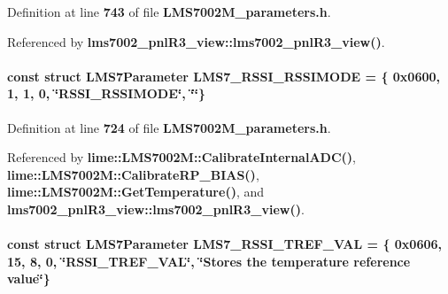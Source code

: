 Definition at line {\bf 743} of file {\bf L\+M\+S7002\+M\+\_\+parameters.\+h}.



Referenced by {\bf lms7002\+\_\+pnl\+R3\+\_\+view\+::lms7002\+\_\+pnl\+R3\+\_\+view()}.

\paragraph[{L\+M\+S7\+\_\+\+R\+S\+S\+I\+\_\+\+R\+S\+S\+I\+M\+O\+DE}]{\setlength{\rightskip}{0pt plus 5cm}const struct {\bf L\+M\+S7\+Parameter} L\+M\+S7\+\_\+\+R\+S\+S\+I\+\_\+\+R\+S\+S\+I\+M\+O\+DE = \{ 0x0600, 1, 1, 0, \char`\"{}\+R\+S\+S\+I\+\_\+\+R\+S\+S\+I\+M\+O\+D\+E\char`\"{}, \char`\"{}\char`\"{}\}\hspace{0.3cm}{\ttfamily [static]}}\label{LMS7002M__parameters_8h_ab9c6791a15331e828922208749cb6026}


Definition at line {\bf 724} of file {\bf L\+M\+S7002\+M\+\_\+parameters.\+h}.



Referenced by {\bf lime\+::\+L\+M\+S7002\+M\+::\+Calibrate\+Internal\+A\+D\+C()}, {\bf lime\+::\+L\+M\+S7002\+M\+::\+Calibrate\+R\+P\+\_\+\+B\+I\+A\+S()}, {\bf lime\+::\+L\+M\+S7002\+M\+::\+Get\+Temperature()}, and {\bf lms7002\+\_\+pnl\+R3\+\_\+view\+::lms7002\+\_\+pnl\+R3\+\_\+view()}.

\paragraph[{L\+M\+S7\+\_\+\+R\+S\+S\+I\+\_\+\+T\+R\+E\+F\+\_\+\+V\+AL}]{\setlength{\rightskip}{0pt plus 5cm}const struct {\bf L\+M\+S7\+Parameter} L\+M\+S7\+\_\+\+R\+S\+S\+I\+\_\+\+T\+R\+E\+F\+\_\+\+V\+AL = \{ 0x0606, 15, 8, 0, \char`\"{}\+R\+S\+S\+I\+\_\+\+T\+R\+E\+F\+\_\+\+V\+A\+L\char`\"{}, \char`\"{}\+Stores the temperature reference value\char`\"{}\}\hspace{0.3cm}{\ttfamily [static]}}\label{LMS7002M__parameters_8h_ac491a4ba1cc361a9dbb0a9e75b64db32}


